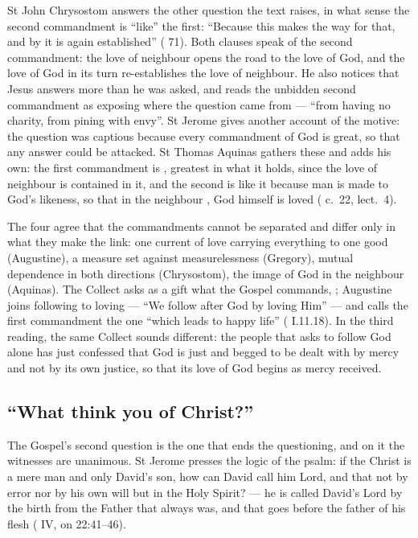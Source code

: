 St John Chrysostom answers the other question the text raises, in what sense
the second commandment is ``like'' the first: ``Because this makes the way for
that, and by it is again established'' ( 71). Both
clauses speak of the second commandment: the love of neighbour opens the road
to the love of God, and the love of God in its turn re-establishes the love of
neighbour. He also notices that Jesus answers more than he was asked, and reads
the unbidden second commandment as exposing where the question came from ---
``from having no charity, from pining with envy''. St Jerome gives another
account of the motive: the question was captious because every commandment of
God is great, so that any answer could be attacked. St Thomas
Aquinas gathers these and adds
his own: the first commandment is , greatest in what
it holds, since the love of neighbour is contained in it, and the second is
like it because man is made to God's likeness, so that in the neighbour
, God himself is loved (
c.~22, lect.~4).

The four agree that the commandments cannot be separated and differ only in
what they make the link: one current of love carrying everything to one good
(Augustine), a measure set against measurelessness (Gregory), mutual dependence
in both directions (Chrysostom), the image of God in the neighbour (Aquinas).
The
Collect asks as a gift what the Gospel commands, ; Augustine joins following to loving --- ``We
follow after God by loving Him'' --- and calls the first commandment the one
``which leads to happy life'' (
I.11.18). In the third reading, the same Collect sounds different: the
people that asks to follow God alone has just confessed that God is just and
begged to be dealt with by mercy and not by its own justice, so that its love
of God begins as mercy received.

\subsection{``What think you of Christ?''}

The Gospel's second question is the one that ends the questioning, and on it
the witnesses are unanimous. St Jerome presses the logic of the psalm: if the
Christ is a mere man and only David's son, how can David call him Lord, and
that not by error nor by his own will but in the Holy Spirit?  --- he is
called David's Lord by the birth from the Father that always was, and that goes
before the father of his flesh ( IV, on
22:41--46).

